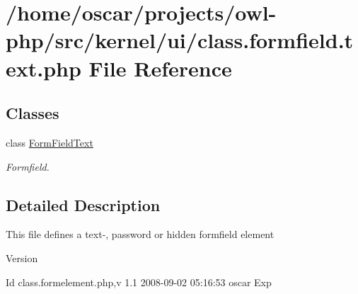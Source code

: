\section{/home/oscar/projects/owl-\/php/src/kernel/ui/class.formfield.text.php File Reference}
\label{class_8formfield_8text_8php}
\subsection*{Classes}
\begin{DoxyCompactItemize}
\item 
class \hyperlink{classFormFieldText}{FormFieldText}
\begin{DoxyCompactList}\small\item\em Formfield. \item\end{DoxyCompactList}\end{DoxyCompactItemize}


\subsection{Detailed Description}
This file defines a text-\/, password or hidden formfield element \begin{DoxyVersion}{Version}

\end{DoxyVersion}
\begin{DoxyParagraph}{Id}
class.formelement.php,v 1.1 2008-\/09-\/02 05:16:53 oscar Exp 
\end{DoxyParagraph}
